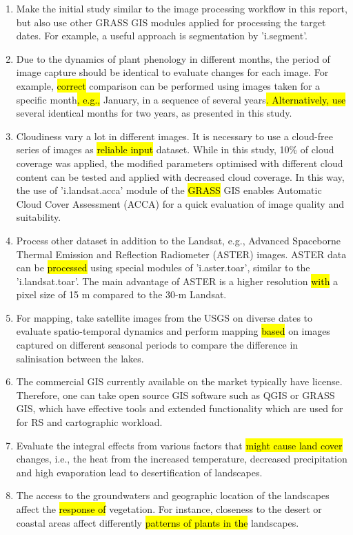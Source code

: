 \documentclass[land,article,submit,pdftex,moreauthors]{Definitions/mdpi}
\begin{document}
\begin{enumerate}
	\item Make the initial study similar to the image processing workflow in this report, but also use other GRASS GIS modules applied for processing the target dates. For example, a useful approach is segmentation by 'i.segment'.
	\item Due to the dynamics of plant phenology in different months, the period of image capture should be identical to evaluate changes for each image. For example, \hl{correct} comparison can be performed using images taken for a specific month\hl{, e.g.,} January, in a sequence of several years\hl{. Alternatively, use} several identical months for two years, as presented in this study.
	\item Cloudiness vary a lot in different images. It is necessary to use a cloud-free series of images as\hl{ reliable input} dataset. While in this study, 10\% of cloud coverage was applied, the modified parameters optimised with different cloud content can be tested and applied with decreased cloud coverage. In this way, the use of 'i.landsat.acca' module of the \hl{GRASS} GIS enables Automatic Cloud Cover Assessment (ACCA) for a quick evaluation of image quality and suitability.
	\item Process other dataset in addition to the Landsat, e.g., Advanced Spaceborne Thermal Emission and Reflection Radiometer (ASTER) images. ASTER data can be \hl{processed} using special modules of 'i.aster.toar', similar to the 'i.landsat.toar'. The main advantage of ASTER is a higher resolution \hl{with }a pixel size of 15 m compared to the 30-m Landsat. 
	\item For mapping, take satellite images from the USGS on diverse dates to evaluate spatio-temporal dynamics and perform mapping \hl{based }on images captured on different seasonal periods to compare the difference in salinisation between the lakes.
	\item The commercial GIS currently available on the market typically have license. Therefore, one can take open source GIS software such as QGIS or GRASS GIS, which have effective tools and extended functionality which are used for for RS and cartographic workload.
	\item Evaluate the integral effects from various factors that \hl{might cause land cover} changes, i.e., the heat from the increased temperature, decreased precipitation and high evaporation lead to desertification of landscapes. 
	\item The access to the groundwaters and geographic location of the landscapes affect the \hl{response of} vegetation. For instance, closeness to the desert or coastal areas affect differently\hl{ patterns of plants in the} landscapes. 

\end{enumerate}
\end{document}
